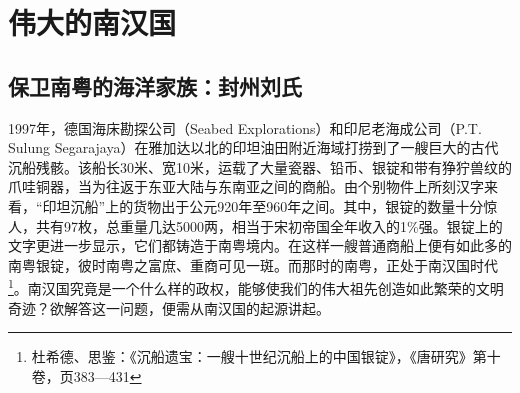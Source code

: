 \chapter{伟大的南汉国}

\section{保卫南粤的海洋家族：封州刘氏}

1997年，德国海床勘探公司（Seabed Explorations）和印尼老海成公司（P.T. Sulung Segarajaya）在雅加达以北的印坦油田附近海域打捞到了一艘巨大的古代沉船残骸。该船长30米、宽10米，运载了大量瓷器、铅币、银锭和带有狰狞兽纹的爪哇铜器，当为往返于东亚大陆与东南亚之间的商船。由个别物件上所刻汉字来看，“印坦沉船”上的货物出于公元920年至960年之间。其中，银锭的数量十分惊人，共有97枚，总重量几达5000两，相当于宋初帝国全年收入的1\%强。银锭上的文字更进一步显示，它们都铸造于南粤境内。在这样一艘普通商船上便有如此多的南粤银锭，彼时南粤之富庶、重商可见一斑。而那时的南粤，正处于南汉国时代\footnote{杜希德、思鉴：《沉船遗宝：一艘十世纪沉船上的中国银锭》，《唐研究》第十卷，页383—431}。南汉国究竟是一个什么样的政权，能够使我们的伟大祖先创造如此繁荣的文明奇迹？欲解答这一问题，便需从南汉国的起源讲起。

